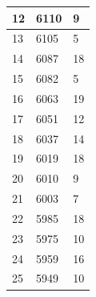 \documentclass{article}
\begin{document}
\begin{center}
\begin{longtable}{|l|l|l|}
		\hline
		12                                                        & 6110                                                               & 9       \\ 
		\hline
		13                                                        & 6105                                                               & 5       \\ 
		\hline
		14                                                        & 6087                                                               & 18      \\ 
		\hline
		15                                                        & 6082                                                               & 5       \\ 
		\hline
		16                                                        & 6063                                                               & 19      \\ 
		\hline
		17                                                        & 6051                                                               & 12      \\ 
		\hline
		18                                                        & 6037                                                               & 14      \\ 
		\hline
		19                                                        & 6019                                                               & 18      \\ 
		\hline
		20                                                        & 6010                                                               & 9       \\ 
		\hline
		21                                                        & 6003                                                               & 7       \\ 
		\hline
		22                                                        & 5985                                                               & 18      \\ 
		\hline
		23                                                        & 5975                                                               & 10      \\ 
		\hline
		24                                                        & 5959                                                               & 16      \\ 
		\hline
		25                                                        & 5949                                                               & 10      \\ 

\end{longtable}
\end{center}
\end{document}
